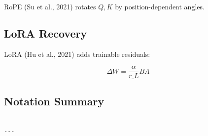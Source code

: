 RoPE (Su et al., 2021) rotates $Q, K$ by position-dependent angles.

\subsection{LoRA Recovery}

LoRA (Hu et al., 2021) adds trainable residuals:

\[
\Delta W = \frac{\alpha}{r\_L} B A
\tag{3.10}
\]

\subsection{Notation Summary}

\begin{lstlisting}

---
\end{lstlisting}